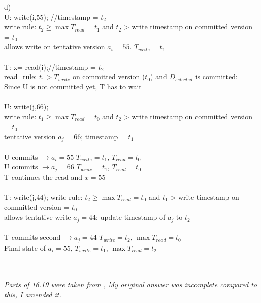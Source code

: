 \documentclass{article}
\begin{document}
    \begin{enumerate}d)\\
        U: write(i,55); //timestamp = $t_2$\\
        write rule: $t_2 \geq \max T_{read} = t_1$ and $t_2$ > write timestamp on committed version = $t_0$\\
        allows write on tentative version $a_i = 55$. $T_{write} = t_1$\\
        \\
        T: x= read(i);//timestamp = $t_2$\\
        read_rule: $t_1 > T_{write}$ on committed version ($t_0$) and $D_{selected}$ is committed:\\
        Since U is not committed yet, T has to wait\\
        \\
        U: write(j,66);\\
        write rule: $t_1 \geq \max T_{read} = t_0$ and $t_2$ > write timestamp on committed version = $t_0$\\
        tentative version $a_j = 66$; timestamp = $t_1$\\
        \\
        U commits $\rightarrow a_i = 55$ $T_{write} = t_1$, $T_{read} = t_0$\\
        U commits $\rightarrow a_j = 66$ $T_{write} = t_1$, $T_{read} = t_0$\\
        T continues the read and $x = 55$\\
        \\
        T: write(j,44);
        write rule: $t_2 \geq \max T_{read} = t_0$ and $t_1$ > write timestamp on committed version = $t_0$\\
        allows tentative write $a_j = 44$; update timestamp of $a_j$ to $t_2$\\
        \\
        T commits second $\rightarrow a_j = 44$ $T_{write} = t_2$, $\max T_{read} = t_0$\\
        Final state of $a_i = 55$, $T_{write} = t_1$, $\max T_{read} = t_2$\\

    \end{enumerate}
\\
\\
\textit{Parts of 16.19 were taken from \citet{Kontogiannis}, My original answer was incomplete compared to this, I amended it.}


\end{document}
